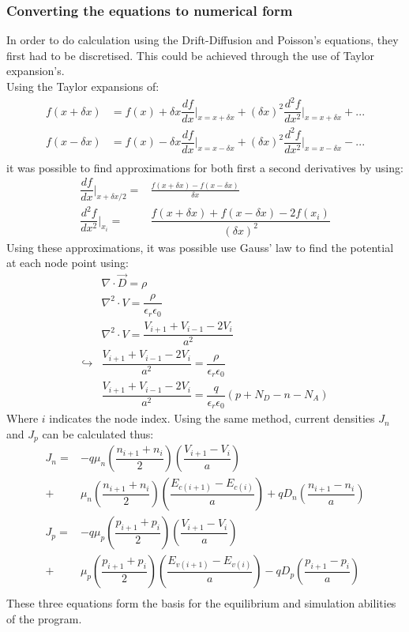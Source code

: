 \documentclass[titlepage]{article}
\begin{document}
\subsubsection{Converting the equations to numerical form}
In order to do calculation using the Drift-Diffusion and Poisson's equations, they first had to be discretised. This could be achieved through the use of Taylor expansion's.\cite{Nkonga}\cite{ECE606}\\
Using the Taylor expansions of:
\begin{eqnarray}
	f(x+\delta x) &= f(x) + \delta x\dfrac{df}{dx}\Big|_{x = x+\delta x} + (\delta x)^2 \dfrac{d^2f}{dx^2}\Big|_{x = x+\delta x} + ...\\
	f(x-\delta x) &= f(x) - \delta x\dfrac{df}{dx}\Big|_{x = x-\delta x} + (\delta x)^2 \dfrac{d^2f}{dx^2}\Big|_{x = x-\delta x} - ...\\
\end{eqnarray}
it was possible to find approximations for both first a second derivatives by using:
\begin{eqnarray}
	\dfrac{df}{dx}\Big|_{x+\delta x/2} =& \frac{f(x+\delta x)-f(x-\delta x)}{\delta x}\\
	\dfrac{d^2f}{dx^2}\Big|_{x_i} =&  \dfrac{f(x+\delta x) + f(x-\delta x) - 2f(x_i)}{(\delta x)^2} 
\end{eqnarray}
Using these approximations, it was possible use Gauss' law to find the potential at each node point using:\cite{ECE606}
\begin{eqnarray}
	&\nabla\cdot\vec{D} = \rho \\
	&\nabla^2 \cdot V = \dfrac{\rho}{\epsilon_r \epsilon_0} \\
	&\nabla^2 \cdot V = \dfrac{V_{i+1}+V_{i-1}-2V_i}{a^2} \\
	\hookrightarrow & \dfrac{V_{i+1}+V_{i-1}-2V_i}{a^2} = \dfrac{\rho}{\epsilon_r \epsilon_0}\\
	& \dfrac{V_{i+1}+V_{i-1}-2V_i}{a^2} = \dfrac{q}{\epsilon_r \epsilon_0}(p+N_D-n-N_A)
\end{eqnarray}
Where $i$ indicates the node index. Using the same method, current densities $J_n$ and $J_p$ can be calculated thus:
\begin{eqnarray}
	J_n =& -q\mu_n(\dfrac{n_{i+1}+n_{i}}{2})(\dfrac{V_{i+1}-V_{i}}{a})\\
	 +& \mu_n (\dfrac{n_{i+1}+n_{i}}{2})(\dfrac{E_{c(i+1)}-E_{c(i)}}{a}) + qD_n(\dfrac{n_{i+1}-n_{i}}{a}) \\
	J_p =& -q\mu_p(\dfrac{p_{i+1}+p_{i}}{2})(\dfrac{V_{i+1}-V_{i}}{a})\\
	 +& \mu_p (\dfrac{p_{i+1}+p_{i}}{2})(\dfrac{E_{v(i+1)}-E_{v(i)}}{a}) - qD_p(\dfrac{p_{i+1}-p_{i}}{a}) \\
\end{eqnarray}
These three equations form the basis for the equilibrium and simulation abilities of the program.
\end{document}
